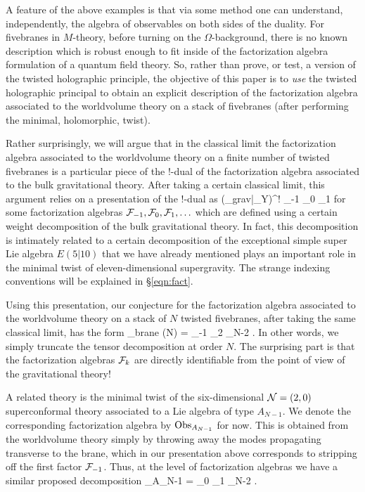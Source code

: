 \documentclass[11pt]{amsart}
\begin{document}
A feature of the above examples is that via some method one can understand, independently, the algebra of observables on both sides of the duality. 
For fivebranes in $M$-theory, before turning on the $\Omega$-background, there is no known description which is robust enough to fit inside of the factorization algebra formulation of a quantum field theory.
So, rather than prove, or test, a version of the twisted holographic principle, the objective of this paper is to \textit{use} the twisted holographic principal to obtain an explicit description of the factorization algebra associated to the worldvolume theory on a stack of fivebranes (after performing the minimal, holomorphic, twist). 

Rather surprisingly, we will argue that in the classical limit the factorization algebra associated to the worldvolume theory on a finite number of twisted fivebranes is a particular piece of the $!$-dual of the factorization algebra associated to the bulk gravitational theory. 
After taking a certain classical limit, this argument relies on a presentation of the $!$-dual as
\beqn
(\Obs_{grav}|_{Y})^{!} \simeq \cF_{-1} \otimes \cF_0 \otimes \cF_1 \otimes \cdots 
\eeqn
for some factorization algebras $\mathcal F_{-1},\mathcal F_0, \mathcal F_{1},\ldots$ which are defined using a certain weight decomposition of the bulk gravitational theory.
In fact, this decomposition is intimately related to a certain decomposition of the exceptional simple super Lie algebra $E(5|10)$ that we have already mentioned plays an important role in the minimal twist of eleven-dimensional supergravity.
The strange indexing conventions will be explained in \S\ref{eqn:fact}. 

Using this presentation, our conjecture for the factorization algebra associated to the worldvolume theory on a stack of $N$ twisted fivebranes, after taking the same classical limit, has the form
\beqn\label{eqn:finiteTensor}
\Obs_{brane} (N) = \cF_{-1} \otimes \cF_2 \otimes \cdots \otimes \cF_{N-2} .
\eeqn
In other words, we simply truncate the tensor decomposition at order $N$.
The surprising part is that the factorization algebras $\mathcal F_k$ are directly identifiable from the point of view of the gravitational theory!

A related theory is the minimal twist of the six-dimensional $\mathcal N=(2,0)$ superconformal theory associated to a Lie algebra of type $A_{N-1}$.
We denote the corresponding factorization algebra by $\operatorname{Obs}_{A_{N-1}}$ for now. 
This is obtained from the worldvolume theory simply by throwing away the modes propagating transverse to the brane, which in our presentation above corresponds to stripping off the first factor $\mathcal F_{-1}$. 
Thus, at the level of factorization algebras we have a similar proposed decomposition
\beqn
\Obs_{A_{N-1}} = \cF_0 \otimes \cF_1 \otimes \cdots \otimes \cF_{N-2} .
\eeqn
\end{document}
